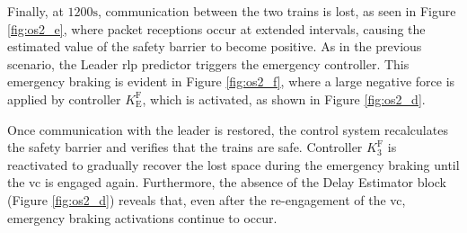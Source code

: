 \documentclass[letterpaper, 10 pt, conference]{ieeeconf}
\theoremstyle{definition}
\theoremstyle{nopoint}
\begin{document}
		Finally, at $1200\unit{\second}$, communication between the two trains is lost, as seen in Figure \ref{fig:os2_e}, where packet receptions occur at extended intervals, causing the estimated value of the safety barrier to become positive. As in the previous scenario, the Leader \gls{rlp} predictor triggers the emergency controller. This emergency braking is evident in Figure \ref{fig:os2_f}, where a large negative force is applied by controller $K_{\mathrm{E}}^\mathrm{F}$, which is activated, as shown in Figure \ref{fig:os2_d}.
		
		Once communication with the leader is restored, the control system recalculates the safety barrier and verifies that the trains are safe. Controller $K_3^\mathrm{F}$ is reactivated to gradually recover the lost space during the emergency braking until the \gls{vc} is engaged again. Furthermore, the absence of the Delay Estimator block (Figure \ref{fig:os2_d}) reveals that, even after the re-engagement of the \gls{vc}, emergency braking activations continue to occur.
		
		
		
\end{document}

